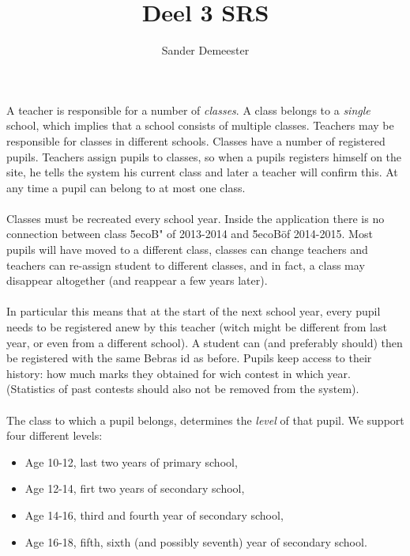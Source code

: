\documentclass[10pt,a4paper]{report}
\author{Sander Demeester}
\title{Deel 3 SRS}
\begin{document}
A teacher is responsible for a number of \emph{classes}. A class belongs to a \emph{single} school, which implies that a school consists of multiple classes. Teachers may be responsible for classes in different schools. Classes have a number of registered pupils. Teachers assign pupils to classes, so when a pupils registers himself on the site, he tells the system his current class and later a teacher will confirm this. At any time a pupil can belong to at most one class. \\
\\
Classes must be recreated every school year. Inside the application there is no connection between class \"5ecoB" of 2013-2014 and \"5ecoB\" of 2014-2015. Most pupils will have moved to a different class, classes can change teachers and teachers can re-assign student to different classes, and in fact, a class may disappear altogether (and reappear a few years later).\\
\\
In particular this means that at the start of the next school year, every pupil needs to be registered anew by this teacher (witch might be different from last year, or even from a different school). A student can (and preferably should) then be registered with the same Bebras id as before. Pupils keep access to their history: how much marks they obtained for wich contest in which year. \\
(Statistics of past contests should also not be removed from the system).\\
\\
The class to which a pupil belongs, determines the \emph{level} of that pupil. We support four different levels:
\begin{itemize}
\item Age 10-12, last two years of primary school,
\item Age 12-14, firt two years of secondary school,
\item Age 14-16, third and fourth year of secondary school,
\item Age 16-18, fifth, sixth (and possibly seventh) year of secondary school.
\end{itemize}
\end{document}
